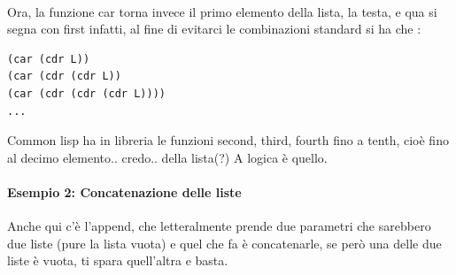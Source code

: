 \documentclass[12pt, a4paper, openany, oneside]{book}
\begin{document}
\paragraph{}
Ora, la funzione car torna invece il primo elemento della lista, la testa, e 
qua si segna con first infatti, al fine di evitarci le combinazioni standard si 
ha che :
\begin{lstlisting}[language=LISP]
(car (cdr L))
(car (cdr (cdr L))
(car (cdr (cdr (cdr L)))) 
...	
\end{lstlisting}
Common lisp ha in libreria le funzioni second, third, fourth fino a tenth, cioè
fino al decimo elemento.. credo.. della lista(?) A logica è quello.     
\paragraph{Esempio 2: Concatenazione delle liste}
Anche qui c'è l'append, che letteralmente prende due parametri che sarebbero due 
liste (pure la lista vuota) e quel che fa è concatenarle, se però una delle
due liste è vuota, ti spara quell'altra e basta.
\end{document}
